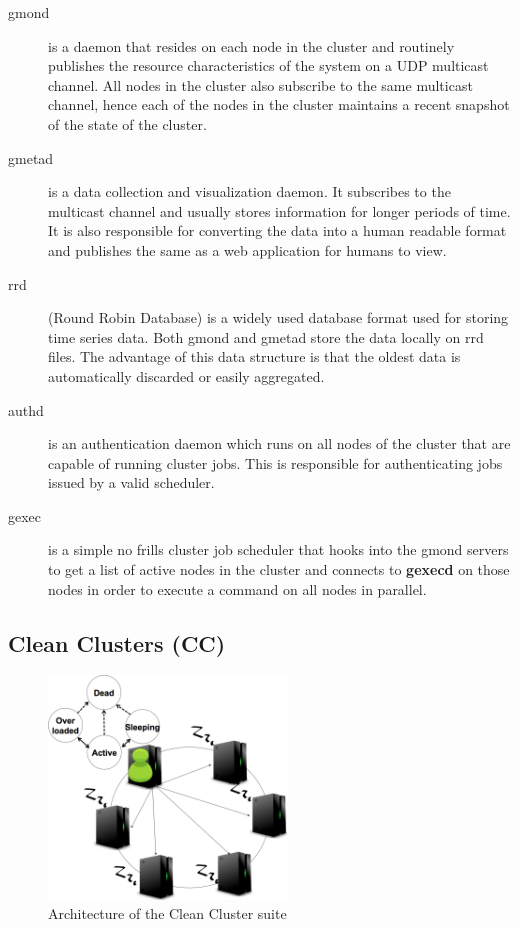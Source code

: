 \begin{description}
    \item[gmond] is a daemon that resides on each node in the cluster and routinely publishes the resource characteristics of the system on a UDP multicast channel. All nodes in the cluster also subscribe to the same multicast channel, hence each of the nodes in the cluster maintains a recent snapshot of the state of the cluster.
    \item[gmetad] is a data collection and visualization daemon. It subscribes to the multicast channel and usually stores information for longer periods of time. It is also responsible for converting the data into a human readable format and publishes the same as a web application for humans to view.
    \item[rrd] (Round Robin Database) is a widely used database format used for storing time series data. Both gmond and gmetad store the data locally on rrd files. The advantage of this data structure is that the oldest data is automatically discarded or easily aggregated.
    \item[authd] is an authentication daemon which runs on all nodes of the cluster that are capable of running cluster jobs. This is responsible for authenticating jobs issued by a valid scheduler.
    \item[gexec] is a simple no frills cluster job scheduler that hooks into the gmond servers to get a list of active nodes in the cluster and connects to {\bf gexecd} on those nodes in order to execute a command on all nodes in parallel.
\end{description}


\subsection{Clean Clusters (CC)} %
\label{sub:cleanclusters_cc_}
\begin{figure}[ht]
\centering
\begin{center}
\includegraphics[width=2.5in]{graphs/CCd-arch.pdf}
\vspace{-0.1in}
\caption{{\normalsize Architecture of the Clean Cluster suite}\label{fig:cc-arch}}
\vspace{-0.1in}
\end{center}
\end{figure}

